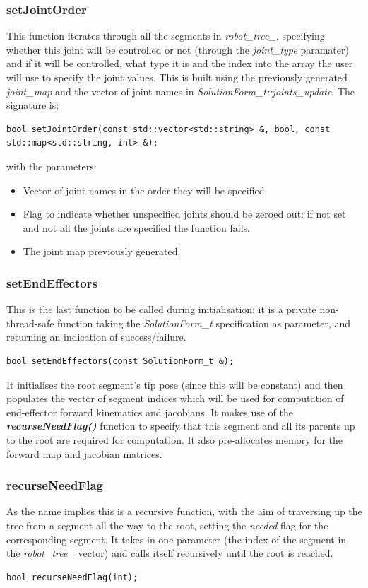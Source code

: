 \documentclass[12pt,a4paper,onecolumn]{article}
\begin{document}
\subsubsection*{setJointOrder}
This function iterates through all the segments in \textit{robot\_tree\_}, specifying whether this joint will be controlled or not (through the \textit{joint\_type} paramater) and if it will be controlled, what type it is and the index into the array the user will use to specify the joint values. This is built using the previously generated \textit{joint\_map} and the vector of joint names in \textit{SolutionForm\_t::joints\_update}. The signature is:
\begin{lstlisting}
bool setJointOrder(const std::vector<std::string> &, bool, const std::map<std::string, int> &);
\end{lstlisting}
with the parameters:
\begin{itemize}
\item Vector of joint names in the order they will be specified
\item Flag to indicate whether unspecified joints should be zeroed out: if not set and not all the joints are specified the function fails.
\item The joint map previously generated.
\end{itemize}

\subsubsection*{setEndEffectors}
This is the last function to be called during initialisation: it is a private non-thread-safe function taking the \textit{SolutionForm\_t} specification as parameter, and returning an indication of success/failure.
\begin{lstlisting}
bool setEndEffectors(const SolutionForm_t &);
\end{lstlisting}
It initialises the root segment's tip pose (since this will be constant) and then populates the vector of segment indices which will be used for computation of end-effector forward kinematics and jacobians. It makes use of the \textit{\textbf{recurseNeedFlag()}} function to specify that this segment and all its parents up to the root are required for computation. It also pre-allocates memory for the forward map and jacobian matrices.

\subsubsection*{recurseNeedFlag}
As the name implies this is a recursive function, with the aim of traversing up the tree from a segment all the way to the root, setting the \textit{needed} flag for the corresponding segment. It takes in one parameter (the index of the segment in the \textit{robot\_tree\_} vector) and calls itself recursively until the root is reached.
\begin{lstlisting}
bool recurseNeedFlag(int);
\end{lstlisting}
\end{document}
